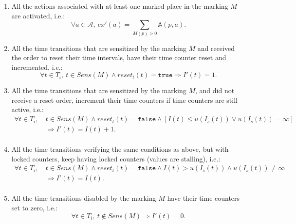 \begin{definition}
\begin{itemize}
\begin{enumerate}[resume]
    \item\label{it:activate-actions} All the actions associated
      with at least one
      marked place in the marking $M$ are activated, i.e.:
      \begin{equation*}
        \forall{}a\in{}\mathcal{A},~ex'(a)=\sum\limits_{M(p)>0}\mathbb{A}(p,a).
      \end{equation*}
    \item\label{it:reset-counters} All the time transitions that are
      sensitized by the marking $M$ and received the order to reset
      their time intervals, have their time counter reset and
      incremented, i.e.:
      \begin{equation*}
        \forall{}t\in{}T_i,~t\in{}Sens(M)\land{}reset_t(t)=\mathtt{true}
        \Rightarrow{}I'(t)=1.
      \end{equation*}
      
    \item\label{it:inc-counters} All the time transitions that are
      sensitized by the marking $M$, and
      did not receive a reset order, increment their time counters if time counters are still active, i.e.:
      \begin{equation*}
        \begin{split}
          \forall{}t\in{}T_i,~&t\in{}Sens(M)\land{}reset_t(t)=\mathtt{false}\land{}[I(t)\le{}u(I_s(t))\lor{}u(I_s(t))=\infty]\\
                              & \Rightarrow{}I'(t)=I(t)+1. \\
        \end{split}
      \end{equation*}
    \item\label{it:locked-counters} All the time transitions
      verifying the same
      conditions as above, but with locked counters, keep having locked counters (values are stalling), i.e.:        
      \begin{equation*}
        \begin{split}
          \forall{}t\in{}T_i,~&t\in{}Sens(M)\land{}reset_t(t)=\mathtt{false}\land{}I(t)>{}u(I_s(t))\land{}u(I_s(t))\neq\infty\\
                              & \Rightarrow{}I'(t)=I(t).\\
        \end{split}
      \end{equation*}
      
    \item\label{it:reset-not-sens} All the time transitions disabled by the marking $M$ have their time counters set to zero, i.e.:
      \begin{equation*}
        \forall{}t\in{}T_i,~t\notin{}Sens(M)\Rightarrow{}I'(t)=0.
      \end{equation*}
    \end{enumerate}
    
  \end{itemize}
\end{definition}

